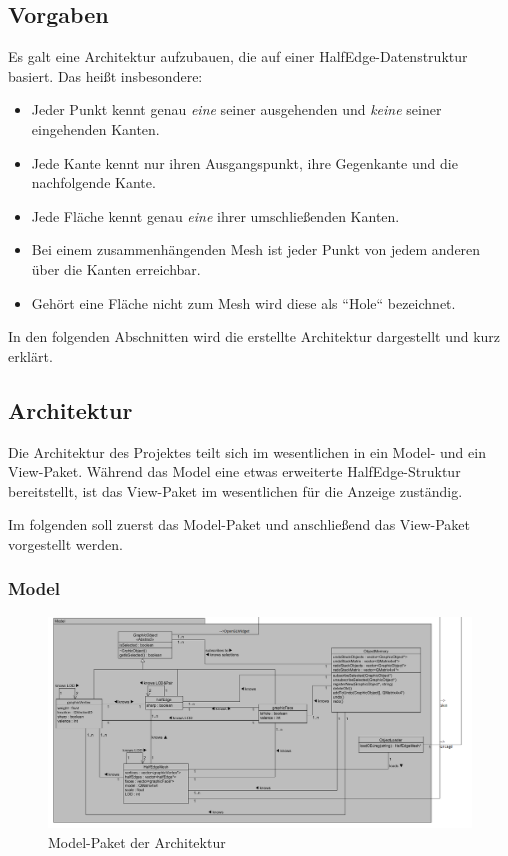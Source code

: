 \subsection{Vorgaben}
Es galt eine Architektur aufzubauen, die auf einer HalfEdge-Datenstruktur basiert. Das heißt insbesondere:
\begin{itemize}
\item Jeder Punkt kennt genau \textit{eine} seiner ausgehenden und \textit{keine} seiner eingehenden Kanten.
\item Jede Kante kennt nur ihren Ausgangspunkt, ihre Gegenkante und die nachfolgende Kante.
\item Jede Fläche kennt genau \textit{eine} ihrer umschließenden Kanten. 
\item Bei einem zusammenhängenden Mesh ist jeder Punkt von jedem anderen über die Kanten erreichbar.
\item Gehört eine Fläche nicht zum Mesh wird diese als ``Hole`` bezeichnet.
\end{itemize}
In den folgenden Abschnitten wird die erstellte Architektur dargestellt und kurz erklärt.

\subsection{Architektur}
Die Architektur des Projektes teilt sich im wesentlichen in ein Model- und ein View-Paket. 
Während das Model eine etwas erweiterte HalfEdge-Struktur bereitstellt, ist das View-Paket im wesentlichen für die Anzeige zuständig. 

Im folgenden soll zuerst das Model-Paket und anschließend das View-Paket vorgestellt werden.

\subsubsection{Model}
\begin{figure}[htbp]
\includegraphics[angle=90,scale=0.5]{content/pictures/architekturModel.png}
\caption{Model-Paket der Architektur}
\label{fig:model}
\end{figure}

